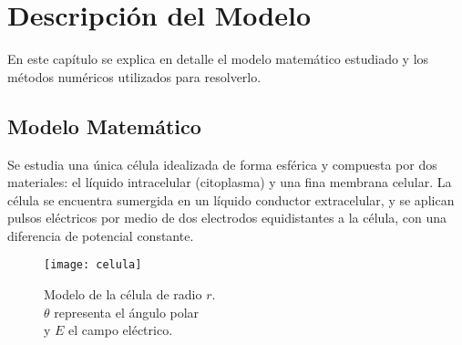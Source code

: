 \chapter{Descripción del Modelo} \label{chap:modelo}




En este capítulo se explica en detalle el modelo matemático estudiado y los métodos numéricos utilizados para resolverlo.

\section{Modelo Matemático}

Se estudia una única célula idealizada de forma esférica y compuesta por dos materiales: el líquido intracelular (citoplasma) y una fina membrana celular. La célula se encuentra sumergida en un líquido conductor extracelular, y se aplican pulsos eléctricos por medio de dos electrodos equidistantes a la célula, con una diferencia de potencial constante.



\begin{figure}[h]
  \begin{minipage}[r]{0.50\textwidth}
    \texttt{[image: celula]}
  \end{minipage}\hfill
  \begin{minipage}[l]{0.5\textwidth}
    \caption{
       Modelo de la célula de radio $r$.\\ $\theta$ representa el ángulo polar\\ y $E$ el campo eléctrico.
    } \label{fig:03-03}
  \end{minipage}
\end{figure}

